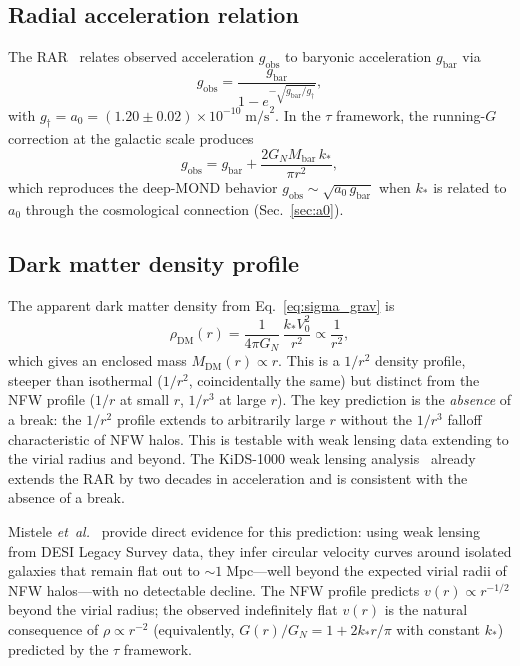 \documentclass[prd,twocolumn,superscriptaddress,longbibliography,floatfix]{revtex4-2}
\newcommand{\tauasym}{\tau}
\begin{document}
\subsection{Radial acceleration relation}

The RAR~\cite{McGaughRAR2016} relates observed acceleration
$g_{\mathrm{obs}}$ to baryonic acceleration $g_{\mathrm{bar}}$
via
\begin{equation}
g_{\mathrm{obs}} = \frac{g_{\mathrm{bar}}}
{1 - e^{-\sqrt{g_{\mathrm{bar}}/g_\dagger}}},
\label{eq:RAR}
\end{equation}
with $g_\dagger = a_0 = (1.20 \pm 0.02) \times 10^{-10}\;
\mathrm{m/s}^2$.  In the $\tauasym$ framework, the
running-$G$ correction at the galactic scale produces
\begin{equation}
g_{\mathrm{obs}} = g_{\mathrm{bar}} +
\frac{2G_N M_{\mathrm{bar}}\, k_*}{\pi r^2},
\label{eq:g_obs}
\end{equation}
which reproduces the deep-MOND behavior
$g_{\mathrm{obs}} \sim \sqrt{a_0\, g_{\mathrm{bar}}}$
when $k_*$ is related to $a_0$ through the cosmological
connection (Sec.~\ref{sec:a0}).

\subsection{Dark matter density profile}

The apparent dark matter density from
Eq.~\eqref{eq:sigma_grav} is
\begin{equation}
\rho_{\mathrm{DM}}(r) = \frac{1}{4\pi G_N}\,
\frac{k_* V_0^2}{r^2} \propto \frac{1}{r^2},
\label{eq:rho_dm}
\end{equation}
which gives an enclosed mass $M_{\mathrm{DM}}(r) \propto r$.
This is a $1/r^2$ density profile, steeper than isothermal
($1/r^2$, coincidentally the same) but distinct from the
NFW profile ($1/r$ at small $r$, $1/r^3$ at large $r$).
The key prediction is the \emph{absence} of a break:
the $1/r^2$ profile extends to arbitrarily large $r$ without
the $1/r^3$ falloff characteristic of NFW halos.  This is
testable with weak lensing data extending to the
virial radius and beyond.  The KiDS-1000 weak lensing
analysis~\cite{Brouwer2021} already extends the RAR by
two decades in acceleration and is consistent with the
absence of a break.

Mistele \emph{et~al.}~\cite{Mistele2024} provide
direct evidence for this prediction: using weak lensing
from DESI Legacy Survey data, they infer circular velocity
curves around isolated galaxies that remain flat out to
$\sim\!1\;\mathrm{Mpc}$---well beyond the expected virial
radii of NFW halos---with no detectable decline.
The NFW profile predicts $v(r) \propto r^{-1/2}$ beyond the
virial radius; the observed indefinitely flat $v(r)$ is
the natural consequence of $\rho \propto r^{-2}$
(equivalently, $G(r)/G_N = 1 + 2k_* r/\pi$ with constant
$k_*$) predicted by the $\tauasym$ framework.
\end{document}
